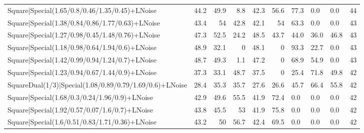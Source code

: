 \begin{tabular}{lrrrrrlllr}
 Square|Special(1.65/0.8/0.46/1.35/0.45)+LNoise                  &            44.2 &            49.9 &             8.8 &            42.3 &           56.6 & 77.3            & 0.0            & 0.0            &           44 \\
 Square|Special(1.38/0.84/0.86/1.77/0.63)+LNoise                 &            43.4 &            54   &            42.8 &            42.1 &           54   & 63.3            & 0.0            & 0.0            &           43 \\
 Square|Special(1.27/0.98/0.45/1.48/0.76)+LNoise                 &            47.3 &            52.5 &            24.2 &            48.5 &           43.7 & 44.0            & 36.0           & 46.8           &           43 \\
 Square|Special(1.18/0.98/0.64/1.94/0.6)+LNoise                  &            48.9 &            32.1 &             0   &            48.1 &            0   & 93.3            & 22.7           & 0.0            &           43 \\
 Square|Special(1.42/0.99/0.94/1.24/0.7)+LNoise                  &            48.7 &            49.3 &             1.1 &            47.2 &            0   & 68.9            & 54.9           & 0.0            &           43 \\
 Square|Special(1.23/0.94/0.67/1.44/0.9)+LNoise                  &            37.3 &            33.1 &            48.7 &            37.5 &            0   & 25.4            & 71.8           & 49.8           &           42 \\
 SquareDual(1/3)|Special(1.08/0.89/0.79/1.69/0.6)+LNoise         &            28.4 &            35.3 &            35.7 &            27.6 &           26.6 & 45.7            & 66.4           & 55.8           &           42 \\
 Square|Special(1.68/0.3/0.24/1.96/0.9)+LNoise                   &            42.9 &            49.6 &            55.5 &            41.9 &           72.4 & 0.0             & 0.0            & 0.0            &           42 \\
 Square|Special(1.92/0.57/0.07/1.6/0.7)+LNoise                   &            43.8 &            45.5 &            53   &            41.9 &           75.8 & 0.0             & 0.0            & 0.0            &           42 \\
 Square|Special(1.6/0.51/0.83/1.71/0.36)+LNoise                  &            43.2 &            50   &            56.7 &            42.4 &           69.5 & 0.0             & 0.0            & 0.0            &           42 \\

\end{tabular}
